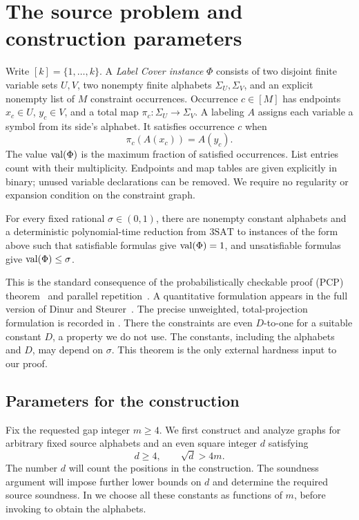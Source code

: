 \section{The source problem and construction parameters}
\label{sec:source}

Write \([k]=\{1,\ldots,k\}\). A \emph{Label Cover instance}
\(\Phi\) consists of two disjoint finite variable sets \(U,V\),
two nonempty finite alphabets \(\Sigma_U,\Sigma_V\), and an explicit
nonempty list of \(M\) constraint occurrences. Occurrence \(c\in[M]\)
has endpoints \(x_c\in U\), \(y_c\in V\), and a total map
\(\pi_c:\Sigma_U\to\Sigma_V\). A labeling \(A\) assigns each
variable a symbol from its side's alphabet. It satisfies occurrence
\(c\) when
\[
  \pi_c(A(x_c))=A(y_c).
\]
The value \(\operatorname{val}(\Phi)\) is the maximum fraction of satisfied
occurrences. List entries count with their multiplicity. Endpoints
and map tables are given explicitly in binary; unused variable
declarations can be removed. We require no regularity or expansion
condition on the constraint graph.

\begin{theorem}
\label{src:hardness}
For every fixed rational \(\sigma\in(0,1)\), there are nonempty
constant alphabets and a deterministic polynomial-time reduction
from \(\mathrm{3SAT}\) to instances of the form above such that
satisfiable formulas give \(\operatorname{val}(\Phi)=1\), and unsatisfiable
formulas give \(\operatorname{val}(\Phi)\leq\sigma\).
\end{theorem}

This is the standard consequence of the probabilistically checkable
proof (PCP) theorem~\cite{AroraSafra98,ALMSS98} and parallel
repetition~\cite{Raz1998}.
A quantitative formulation appears in the full version of Dinur
and Steurer~\cite[Theorem~6.2]{DinurSteurer2014}.
The precise unweighted, total-projection formulation is
recorded in \cite[Definitions~1.1--1.2 and Theorem~1.3]{DKKMS2025}.
There the constraints are even \(D\)-to-one for a suitable constant
\(D\), a property we do not use. The constants, including the
alphabets and \(D\), may depend on \(\sigma\). This theorem is the
only external hardness input to our proof.

\subsection{Parameters for the construction}

Fix the requested gap integer \(m\geq4\). We first construct and
analyze graphs for arbitrary fixed source alphabets and an even square
integer \(d\) satisfying
\begin{equation}
 d\geq4,\qquad \sqrt d>4m.
 \label{src:dimension-bounds}
\end{equation}
The number \(d\) will count the positions in the construction.
The soundness argument will impose further lower bounds on \(d\)
and determine the required source soundness. In
 we choose all these constants as functions of
\(m\), before invoking  to obtain the alphabets.

